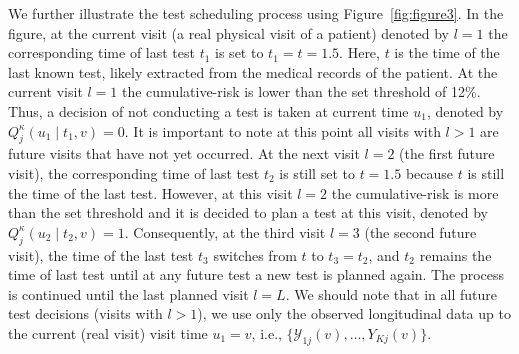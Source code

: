 \documentclass[AMA,STIX1COL]{WileyNJD-v2}
\begin{document}
We further illustrate the test scheduling process using Figure~\ref{fig:figure3}. In the figure, at the current visit (a real physical visit of a patient) denoted by $l=1$ the corresponding time of last test $t_1$ is set to $t_1 = t =1.5$. Here, $t$ is the time of the last known test, likely extracted from the medical records of the patient. At the current visit $l=1$ the cumulative-risk is lower than the set threshold of 12\%. Thus, a decision of not conducting a test is taken at current time $u_1$, denoted by $Q_j^\kappa (u_1 \mid t_1, v) = 0$. It is important to note at this point all visits with $l>1$ are future visits that have not yet occurred. At the next visit $l=2$ (the first future visit), the corresponding time of last test $t_2$ is still set to $t=1.5$ because $t$ is still the time of the last test. However, at this visit $l=2$ the cumulative-risk is more than the set threshold and it is decided to plan a test at this visit, denoted by $Q_j^\kappa (u_2 \mid t_2, v) = 1$. Consequently, at the third visit $l=3$ (the second future visit), the time of the last test $t_3$ switches from $t$ to $t_3 = t_2$, and $t_2$ remains the time of last test until at any future test a new test is planned again. The process is continued until the last planned visit $l=L$. We should note that in all future test decisions (visits with $l > 1$), we use only the observed longitudinal data up to the current (real visit) visit time $u_1 = v$, i.e., $\{\mathcal Y_{1j}(v), \ldots, Y_{Kj}(v)\}$.
\end{document}
